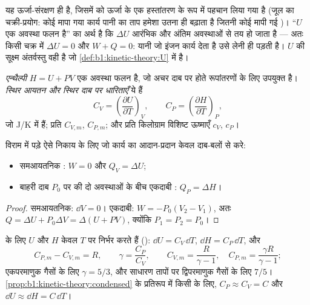\begin{remark}[यह कहता क्या है]\label{rem:b1:first-law:meaning}
यह ऊर्जा-संरक्षण ही है, जिसमें  को ऊर्जा के एक हस्तांतरण के रूप में
पहचान लिया गया है (जूल का चक्री-प्रयोग: कोई मापा गया कार्य पानी का ताप
हमेशा उतना ही बढ़ाता है जितनी कोई मापी गई )। ``$U$ एक अवस्था फलन है''
का अर्थ है कि $\Delta U$ आरंभिक और अंतिम अवस्थाओं से तय हो जाता है ---
अतः किसी चक्र में $\Delta U = 0$ और $W + Q = 0$: यानी जो इंजन कार्य देता
है उसे  लेनी ही पड़ती है। $U$ की सूक्ष्म अंतर्वस्तु वही है जो
\cref{def:b1:kinetic-theory:U} में है।
\end{remark}

\begin{definition}[एन्थैल्पी; ऊष्मा धारिताएँ]\label{def:b1:first-law:enthalpy}
\emph{एन्थैल्पी} $H = U + PV$ एक अवस्था फलन है, जो अचर दाब पर होते
रूपांतरणों के लिए उपयुक्त है। \emph{स्थिर आयतन और स्थिर दाब पर 
धारिताएँ} ये हैं
\[
C_V = \left(\frac{\partial U}{\partial T}\right)_V, \qquad
C_P = \left(\frac{\partial H}{\partial T}\right)_P ,
\]
जो \unit{J/K} में हैं; प्रति  $C_{V,m}$, $C_{P,m}$; और प्रति किलोग्राम
विशिष्ट ऊष्माएँ $c_V$, $c_P$।
\end{definition}

\begin{proposition}[स्थिर आयतन पर और स्थिर दाब पर ऊष्मा]\label{prop:b1:first-law:qvqp}
विराम में पड़े ऐसे निकाय के लिए जो कार्य का आदान-प्रदान केवल दाब-बलों से करे:
\begin{itemize}
  \item समआयतनिक : $W = 0$ और $Q_V = \Delta U$;
  \item बाहरी दाब $P_0$ पर की दो अवस्थाओं के बीच एकदाबी :
        $Q_P = \Delta H$।
\end{itemize}
\end{proposition}

\begin{proof}
समआयतनिक: $\dd V = 0$। एकदाबी: $W = -P_0(V_2 - V_1)$, अतः $Q = \Delta U +
P_0\Delta V = \Delta(U + PV)$, क्योंकि $P_1 = P_2 = P_0$।
\end{proof}

\begin{proposition}[आदर्श गैस: $U$, $H$, मेयर का संबंध]\label{prop:b1:first-law:gas}
 के लिए $U$ और $H$ केवल $T$ पर निर्भर करते हैं ():
$\dd U = C_V\,\dd T$, $\dd H = C_P\,\dd T$, और
\[
C_{P,m} - C_{V,m} = R, \qquad \gamma = \frac{C_P}{C_V}, \qquad
C_{V,m} = \frac{R}{\gamma - 1}, \quad C_{P,m} = \frac{\gamma R}{\gamma - 1} ;
\]
एकपरमाणुक गैसों के लिए $\gamma = 5/3$, और साधारण तापों पर द्विपरमाणुक
गैसों के लिए $7/5$। \cref{prop:b1:kinetic-theory:condensed} के प्रतिरूप में
किसी  के लिए, $C_P \approx C_V = C$ और
$\dd U \approx \dd H = C\,\dd T$।
\end{proposition}

